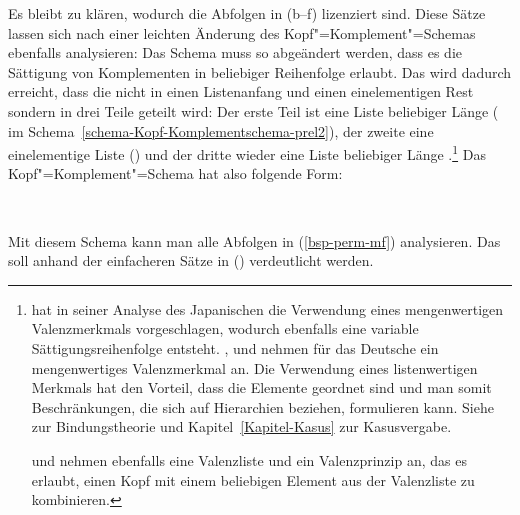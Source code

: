 Es bleibt zu klären, wodurch die Abfolgen in (b--f) lizenziert sind. Diese
Sätze lassen sich nach einer leichten Änderung des Kopf"=Komplement"=Schemas ebenfalls
analysieren: Das Schema muss so abgeändert werden, dass es die Sättigung von Komplementen
in beliebiger Reihenfolge erlaubt. Das wird dadurch erreicht, dass die \compsl nicht
in einen Listenanfang und einen einelementigen Rest sondern in drei Teile geteilt wird: Der erste
Teil ist eine Liste beliebiger Länge (\, im Schema~\ref{schema-Kopf-Komplementschema-prel2}), der zweite eine einelementige Liste () und der dritte wieder eine
Liste beliebiger Länge .\footnote{
  \citet{Gunji86a} hat in seiner Analyse des Japanischen die Verwendung eines
  mengenwertigen Valenzmerkmals vorgeschlagen, wodurch ebenfalls eine variable Sättigungsreihenfolge
  entsteht. \citet{HN89a}, \citet{Pollard90a} und \citet*{EEU92a} nehmen für das Deutsche
  ein mengenwertiges Valenzmerkmal an. Die Verwendung eines listenwertigen Merkmals hat den
  Vorteil, dass die Elemente geordnet sind und man somit Beschränkungen, die sich auf
  Hierarchien beziehen, formulieren kann. Siehe  zur Bindungstheorie und
  Kapitel~\ref{Kapitel-Kasus} zur Kasusvergabe. 

  \citet[]{FR92} und \citet[--223]{Kiss95b} nehmen ebenfalls eine Valenzliste und ein Valenzprinzip an, das es erlaubt,
  einen Kopf mit einem beliebigen Element aus der Valenzliste zu kombinieren.%
}
Das Kopf"=Komplement"=Schema hat also folgende Form:
\begin{samepage}
\begin{schema}
\label{schema-Kopf-Komplementschema-prel2}
 \impl\\
\end{schema}
\end{samepage}
Mit diesem Schema kann man alle Abfolgen in (\ref{bsp-perm-mf}) analysieren. Das soll
anhand der einfacheren Sätze in () verdeutlicht werden.
